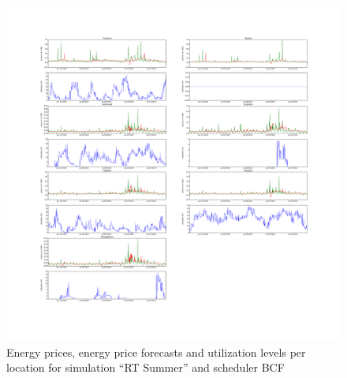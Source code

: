 \begin{figure}[htbp]
	\centering
	\vspace*{-0.6in}
	\hspace*{-1.9in}
		\includegraphics[width=1.60\textwidth]{figures/appendix_simulation_results/RT_Summer_scenario_2.pdf}
	\vspace*{-1.0in}
	\caption{Energy prices, energy price forecasts and utilization levels per location for simulation ``RT Summer'' and scheduler BCF}
	\label{fig:app_RT_Summer_scenario_2}
\end{figure}


